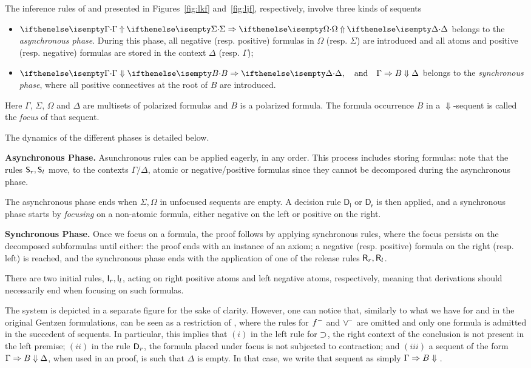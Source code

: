 The inference rules of \LKF and \LJF presented in Figures~\ref{fig:lkf} and~\ref{fig:ljf}, respectively, involve three kinds of sequents 
\begin{itemize}
\item $\jUnf{\Gamma}{\Sigma}{\Omega}{\Delta}$ belongs to the {\em asynchronous phase}. During this phase, all negative (resp. positive) formulas in  $\Omega$ (resp. $\Sigma$) are introduced and all atoms and positive (resp. negative) formulas  are stored in the context $\Delta$ (resp. $\Gamma$);
\item $\jLf{\Gamma}{B}{\Delta},\quad\hbox{and}\quad
  \jRf{\Gamma}{B}{\Delta}$ belongs to the {\em synchronous phase}, where all positive connectives at the root of $B$ are introduced. 
\end{itemize}
Here $\Gamma$, $\Sigma$, $\Omega$ and $\Delta$ are
multisets of polarized formulas and $B$ is a polarized formula.
%
The formula occurrence $B$ in a $\Downarrow$-sequent is called the
\emph{focus} of that sequent.

The dynamics of the different phases is detailed below.

\noindent
{\bf Asynchronous Phase.} Asunchronous rules can be applied eagerly, in any order.
This process includes storing formulas: note that the rules $\mathsf{S}_r, \mathsf{S}_l$ move, to the 
contexts $\Gamma/\Delta$, atomic or negative/positive formulas since they cannot be decomposed during the asynchronous phase.

The asynchronous phase ends when $\Sigma,\Omega$ in unfocused sequents are empty. A decision rule $\mathsf{D_l}$ or  $\mathsf{D_r}$ is then applied,  and
a synchronous phase starts by {\em focusing} on a non-atomic formula, either negative on the left or positive on the right.

\noindent
{\bf Synchronous Phase.} Once we focus on a formula, the proof  follows by applying synchronous rules, where  the focus persists on the decomposed subformulas until either: the proof ends with an instance of an axiom;
a negative (resp. positive) formula  on the right (resp. left) is reached, and the synchronous phase  ends with the application of one of the release rules $\mathsf{R}_r,\mathsf{R}_l$.


There are two initial rules, $\mathsf{I}_r,\mathsf{I}_l$, acting on right positive atoms and left negative atoms, respectively, meaning that derivations should necessarily end when focusing on such formulas.


The system  \LJF is depicted in a separate figure for the sake of clarity.
%
However, one can notice that, similarly to what we have for \LJ and
\LK in the original Gentzen formulations, \LJF can be seen as a
restriction of \LKF, where the rules for $f^-$ and $\vee^{\!-}$ are
omitted and only one formula is admitted in the succedent of sequents.  In
particular, this implies that $(i)$ in the left rule for $\supset$, the
right context of the conclusion is not present in the left premise;
$(ii)$ in the rule $\mathsf{D}_r$, the formula placed under focus is
not subjected to contraction; and $(iii)$ a sequent of the form $\Gamma \Rightarrow B \Downarrow{\Delta}$, when used in an
\LJF proof, is such that $\Delta$ is empty.
%
In that case, we write that sequent as simply $\Gamma \Rightarrow B \Downarrow{}$.